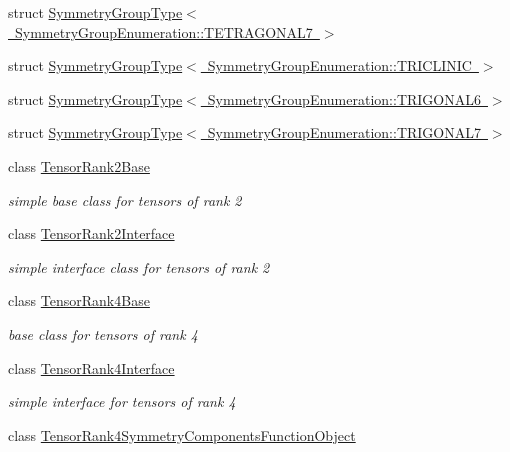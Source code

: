 \begin{DoxyCompactItemize}
\item 
struct \mbox{\hyperlink{structmpc_1_1core_1_1_symmetry_group_type_3_01_symmetry_group_enumeration_1_1_t_e_t_r_a_g_o_n_a_l7_01_4}{Symmetry\+Group\+Type$<$ Symmetry\+Group\+Enumeration\+::\+T\+E\+T\+R\+A\+G\+O\+N\+A\+L7 $>$}}
\item 
struct \mbox{\hyperlink{structmpc_1_1core_1_1_symmetry_group_type_3_01_symmetry_group_enumeration_1_1_t_r_i_c_l_i_n_i_c_01_4}{Symmetry\+Group\+Type$<$ Symmetry\+Group\+Enumeration\+::\+T\+R\+I\+C\+L\+I\+N\+I\+C $>$}}
\item 
struct \mbox{\hyperlink{structmpc_1_1core_1_1_symmetry_group_type_3_01_symmetry_group_enumeration_1_1_t_r_i_g_o_n_a_l6_01_4}{Symmetry\+Group\+Type$<$ Symmetry\+Group\+Enumeration\+::\+T\+R\+I\+G\+O\+N\+A\+L6 $>$}}
\item 
struct \mbox{\hyperlink{structmpc_1_1core_1_1_symmetry_group_type_3_01_symmetry_group_enumeration_1_1_t_r_i_g_o_n_a_l7_01_4}{Symmetry\+Group\+Type$<$ Symmetry\+Group\+Enumeration\+::\+T\+R\+I\+G\+O\+N\+A\+L7 $>$}}
\item 
class \mbox{\hyperlink{structmpc_1_1core_1_1_tensor_rank2_base}{Tensor\+Rank2\+Base}}
\begin{DoxyCompactList}\small\item\em simple base class for tensors of rank 2 \end{DoxyCompactList}\item 
class \mbox{\hyperlink{structmpc_1_1core_1_1_tensor_rank2_interface}{Tensor\+Rank2\+Interface}}
\begin{DoxyCompactList}\small\item\em simple interface class for tensors of rank 2 \end{DoxyCompactList}\item 
class \mbox{\hyperlink{structmpc_1_1core_1_1_tensor_rank4_base}{Tensor\+Rank4\+Base}}
\begin{DoxyCompactList}\small\item\em base class for tensors of rank 4 \end{DoxyCompactList}\item 
class \mbox{\hyperlink{structmpc_1_1core_1_1_tensor_rank4_interface}{Tensor\+Rank4\+Interface}}
\begin{DoxyCompactList}\small\item\em simple interface for tensors of rank 4 \end{DoxyCompactList}\item 
class \mbox{\hyperlink{structmpc_1_1core_1_1_tensor_rank4_symmetry_components_function_object}{Tensor\+Rank4\+Symmetry\+Components\+Function\+Object}}

\end{DoxyCompactItemize}
